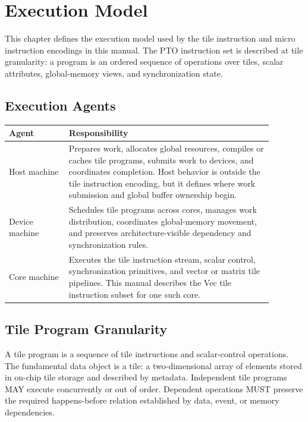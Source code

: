\section{Execution Model}
This chapter defines the execution model used by the tile instruction and micro instruction encodings in this manual. The PTO instruction set is described at tile granularity: a program is an ordered sequence of operations over tiles, scalar attributes, global-memory views, and synchronization state.

\subsection{Execution Agents}
\begin{longtable}{@{}L{0.20\linewidth}L{0.68\linewidth}@{}}
\toprule
Agent & Responsibility \\
\midrule
Host machine & Prepares work, allocates global resources, compiles or caches tile programs, submits work to devices, and coordinates completion. Host behavior is outside the tile instruction encoding, but it defines where work submission and global buffer ownership begin. \\
Device machine & Schedules tile programs across cores, manages work distribution, coordinates global-memory movement, and preserves architecture-visible dependency and synchronization rules. \\
Core machine & Executes the tile instruction stream, scalar control, synchronization primitives, and vector or matrix tile pipelines. This manual describes the Vec tile instruction subset for one such core. \\
\bottomrule
\end{longtable}

\subsection{Tile Program Granularity}
A tile program is a sequence of tile instructions and scalar-control operations. The fundamental data object is a tile: a two-dimensional array of elements stored in on-chip tile storage and described by metadata. Independent tile programs MAY execute concurrently or out of order. Dependent operations MUST preserve the required happens-before relation established by data, event, or memory dependencies.

